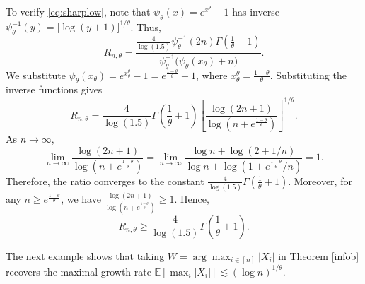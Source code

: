 \documentclass[11pt]{article}
\begin{document}
To verify \eqref{eq:sharplow}, note that
$\psi_\theta(x)=e^{x^\theta}-1$ has inverse
$\psi_\theta^{-1}(y)=\bigl[\log(y+1)\bigr]^{1/\theta}$. Thus,
\begin{equation*}
    R_{n,\theta}= \frac{\frac{4}{\log(1.5)} \psi_\theta^{-1}(2n) \Gamma\left(\frac{1}{\theta}+1\right)}{\psi_\theta^{-1}\bigl(\psi_\theta(x_\theta)+n\bigr)}.
\end{equation*}
We substitute $\psi_\theta(x_\theta) = e^{x_\theta^\theta} - 1=e^{\frac{1-\theta}{\theta}} - 1$, where $x_\theta^\theta = \frac{1-\theta}{\theta}$.
Substituting the inverse functions gives
\begin{equation*}
    R_{n,\theta} = \frac{4}{\log(1.5)} \Gamma\left(\frac{1}{\theta}+1\right) \left[ \frac{\log(2n+1)}{\log(n + e^{\frac{1-\theta}{\theta}})} \right]^{1/\theta}.
\end{equation*}
As $n\to\infty$,
\begin{equation*}
    \lim_{n \to \infty} \frac{\log(2n+1)}{\log(n + e^{\frac{1-\theta}{\theta}})} = \lim_{n \to \infty} \frac{\log n + \log(2 + 1/n)}{\log n + \log(1 + e^{\frac{1-\theta}{\theta}}/n)} = 1.
\end{equation*}
Therefore, the ratio converges to the constant
$\frac{4}{\log(1.5)} \Gamma\left(\frac{1}{\theta}+1\right)$. Moreover, for any
$n \ge e^{\frac{1-\theta}{\theta}}$, we have
$\frac{\log(2n+1)}{\log(n + e^{\frac{1-\theta}{\theta}})} \geq 1$. Hence,
\begin{equation*}
    R_{n,\theta} \ge \frac{4}{\log(1.5)} \Gamma\left(\frac{1}{\theta}+1\right).
\end{equation*}


The next example shows that taking $W=\arg\max_{i\in[n]}|X_i|$ in Theorem \ref{infob} recovers the maximal growth rate $\mathbb{E}[\max_i|X_i|]\lesssim(\log n)^{1/\theta}$.
\end{document}
